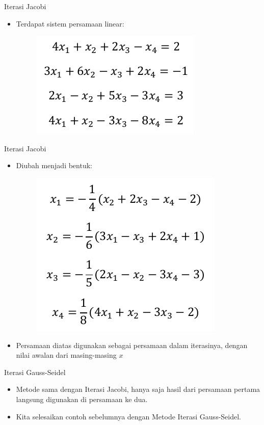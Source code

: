 \documentclass[pdflatex,compress,mathserif]{beamer}
\begin{document}
\begin{frame}{Iterasi Jacobi}
    \begin{itemize}
        \item Terdapat sistem persamaan linear:
        \begin{figure}
            \includegraphics[width=0.5\linewidth]{./img/img03.png}
        \end{figure}
    \end{itemize}
\end{frame}

\begin{frame}{Iterasi Jacobi}
    \begin{itemize}
        \item Diubah menjadi bentuk:
        \begin{figure}
            \includegraphics[width=0.5\linewidth]{./img/img04.png}
        \end{figure}
        \item Persamaan diatas digunakan sebagai persamaan dalam iterasinya, dengan nilai awalan dari masing-masing $x$
    \end{itemize}
\end{frame}

\begin{frame}{Iterasi Gauss-Seidel}
    \begin{itemize}
        \item Metode sama dengan Iterasi Jacobi, hanya saja hasil dari persamaan pertama langsung digunakan di persamaan ke dua.
        \item Kita selesaikan contoh sebelumnya dengan Metode Iterasi Gauss-Seidel.
    \end{itemize}
\end{frame}
\end{document}
